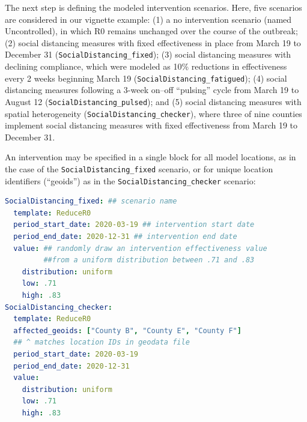 {The next step is defining the modeled intervention scenarios. Here, five scenarios are considered in our vignette example: (1) a no intervention scenario (named Uncontrolled), in which R0 remains unchanged over the course of the outbreak; (2) social distancing measures with fixed effectiveness in place from March 19 to December 31 (\verb|SocialDistancing_fixed|); (3) social distancing measures with declining compliance, which were modeled as 10\% reductions in effectiveness every 2 weeks beginning March 19 (\verb|SocialDistancing_fatigued|); (4) social distancing measures following a 3-week on–off “pulsing” cycle from March 19 to August 12 (\verb|SocialDistancing_pulsed|); and (5) social distancing measures with spatial heterogeneity (\verb|SocialDistancing_checker|), where three of nine counties implement social distancing measures with fixed effectiveness from March 19 to December 31.


An intervention may be specified in a single block for all model locations, as in the case of the \verb|SocialDistancing_fixed| scenario, or for unique location identifiers (“geoids”) as in the \verb|SocialDistancing_checker| scenario:
\begin{lstlisting}[language=yaml]
SocialDistancing_fixed: ## scenario name 
  template: ReduceR0 
  period_start_date: 2020-03-19 ## intervention start date 
  period_end_date: 2020-12-31 ## intervention end date 
  value: ## randomly draw an intervention effectiveness value 
         ##from a uniform distribution between .71 and .83 
    distribution: uniform 
    low: .71 
    high: .83 
SocialDistancing_checker: 
  template: ReduceR0 
  affected_geoids: ["County B", "County E", "County F"] 
  ## ^ matches location IDs in geodata file 
  period_start_date: 2020-03-19 
  period_end_date: 2020-12-31 
  value: 
    distribution: uniform 
    low: .71
    high: .83
\end{lstlisting}

}
